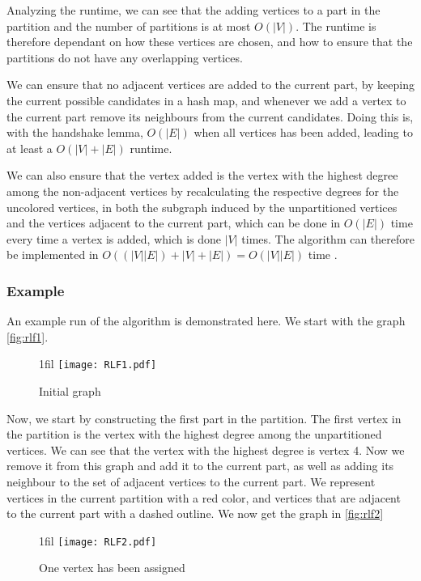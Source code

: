 \documentclass[a4paper]{article}
\makeatletter
\newcommand*{\centerfloat}{%
  \parindent \z@
  \leftskip \z@ \@plus 1fil \@minus \textwidth
  \rightskip\leftskip
  \parfillskip \z@skip}
\makeatother
\begin{document}
Analyzing the runtime, we can see that the adding vertices to a
part in the partition and the number of partitions is at most $O(|V|)$. The
runtime is therefore dependant on how these vertices are chosen, and how to
ensure that the partitions do not have any overlapping vertices. 

We can ensure
that no adjacent vertices are added to the current part, by keeping the current
possible candidates in a hash map, and whenever we add a vertex to the current
part remove its neighbours from the current candidates. Doing this is, with the
handshake lemma, $O(|E|)$ when all vertices has been added, leading to at least
a $O(|V|+|E|)$ runtime.  

We can also ensure that the vertex added is the vertex with the highest degree among
the non-adjacent vertices by recalculating the respective degrees for the
uncolored vertices, in both the subgraph induced by the unpartitioned vertices and the vertices 
adjacent to the current part, which can be done in $O(|E|)$ time every time a vertex is
added, which is done $|V|$ times. The algorithm can therefore be implemented in
$O((|V||E|)+|V|+|E|) = O(|V||E|)$ time \cite{Constructive}.

\subsubsection{Example}

An example run of the algorithm is demonstrated here. We start with the graph 
\autoref{fig:rlf1}.

\begin{figure}[H]
    \centerfloat
    \texttt{[image: RLF1.pdf]}
    \caption{Initial graph}
    \label{fig:rlf1}
\end{figure}

Now, we start by constructing the first part in the partition. The first vertex
in the partition is the vertex with the highest degree among the unpartitioned
vertices. We can see that the
vertex with the highest degree is vertex 4. Now we remove it from this graph
and add it to the current part, as well as adding its neighbour to the set
of adjacent vertices to the current part. We represent vertices in the current
partition with a red color, and vertices that are adjacent to the current part
with a dashed outline. We now get the graph in \autoref{fig:rlf2}

\begin{figure}[H]
    \centerfloat
    \texttt{[image: RLF2.pdf]}
    \caption{One vertex has been assigned}
    \label{fig:rlf2}
\end{figure}
\end{document}
